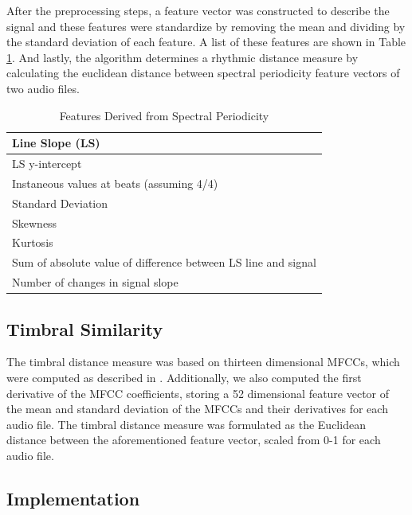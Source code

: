 \documentclass{article}
\begin{document}
After the preprocessing steps, a feature vector was constructed to describe the signal and these features were standardize by removing the mean and dividing by the standard deviation of each feature. A list of these features are shown in Table \ref{tab:bs_feat}. And lastly, the algorithm determines a rhythmic distance measure by calculating the euclidean distance between spectral periodicity feature vectors of two audio files.

\begin{table}[h!]
  \begin{center}
    \begin{tabular}{| p{7.0cm} |}
    \hline
    Line Slope (LS) \\
    \hline
	LS y-intercept\\
	    \hline
	Instaneous values at beats (assuming 4/4) \\
	    \hline
	Standard Deviation \\
	    \hline
	Skewness \\
	    \hline
	Kurtosis \\
	    \hline
	Sum of absolute value of difference between LS line and signal \\
	    \hline
	Number of changes in signal slope \\    \hline
    \end{tabular}
  \end{center}
  \caption{Features Derived from Spectral Periodicity}\label{tab:bs_feat}
\end{table}
    

\subsection{Timbral Similarity}

The timbral distance measure was based on thirteen dimensional MFCCs, which were computed as described in \cite{jensen2009quantitative}. Additionally, we also computed the first derivative of the MFCC coefficients, storing a 52 dimensional feature vector of the mean and standard deviation of the MFCCs and their derivatives for each audio file. The timbral distance measure was formulated as the Euclidean distance between the aforementioned feature vector, scaled from 0-1 for each audio file.

\subsection{Implementation}
\end{document}
